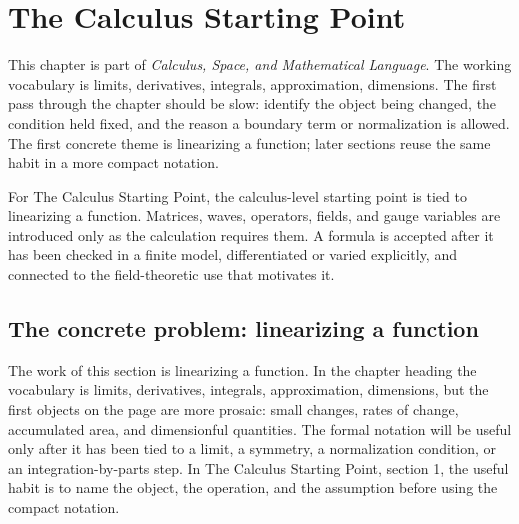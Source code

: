 \chapter{The Calculus Starting Point}


This chapter is part of \emph{Calculus, Space, and Mathematical Language}.  The working vocabulary is limits, derivatives, integrals, approximation, dimensions.  The first pass through the chapter should be slow: identify the object being changed, the condition held fixed, and the reason a boundary term or normalization is allowed.  The first concrete theme is linearizing a function; later sections reuse the same habit in a more compact notation.

For The Calculus Starting Point, the calculus-level starting point is tied to linearizing a function.  Matrices, waves, operators, fields, and gauge variables are introduced only as the calculation requires them.  A formula is accepted after it has been checked in a finite model, differentiated or varied explicitly, and connected to the field-theoretic use that motivates it.

\section{The concrete problem: linearizing a function}













The work of this section is linearizing a function.  In the chapter heading the vocabulary is limits, derivatives, integrals, approximation, dimensions, but the first objects on the page are more prosaic: small changes, rates of change, accumulated area, and dimensionful quantities.  The formal notation will be useful only after it has been tied to a limit, a symmetry, a normalization condition, or an integration-by-parts step.  In The Calculus Starting Point, section 1, the useful habit is to name the object, the operation, and the assumption before using the compact notation.

